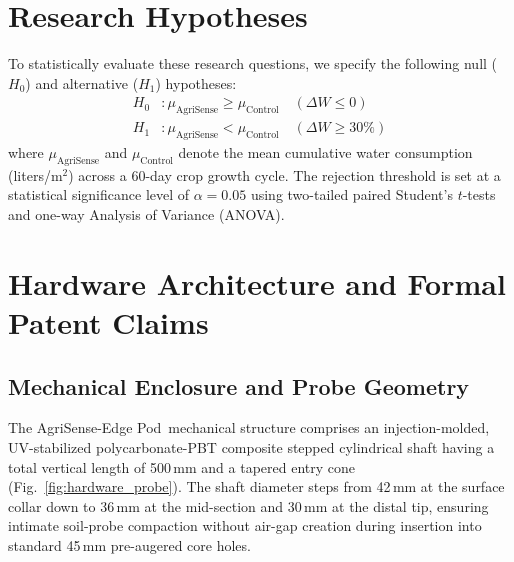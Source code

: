 \documentclass[journal,10pt,twocolumn]{IEEEtran}
\begin{document}
\section{Research Hypotheses}
To statistically evaluate these research questions, we specify the following null ($H_0$) and alternative ($H_1$) hypotheses:
\begin{equation}
\begin{aligned}
    H_0 &: \mu_{\text{AgriSense}} \ge \mu_{\text{Control}} \quad (\Delta W \le 0) \\
    H_1 &: \mu_{\text{AgriSense}} < \mu_{\text{Control}} \quad (\Delta W \ge 30\%)
\end{aligned}
\end{equation}
where $\mu_{\text{AgriSense}}$ and $\mu_{\text{Control}}$ denote the mean cumulative water consumption (liters/m$^2$) across a 60-day crop growth cycle. The rejection threshold is set at a statistical significance level of $\alpha = 0.05$ using two-tailed paired Student's $t$-tests and one-way Analysis of Variance (ANOVA).

\section{Hardware Architecture and Formal Patent Claims}
\subsection{Mechanical Enclosure and Probe Geometry}
The AgriSense-Edge Pod\texttrademark\ mechanical structure comprises an injection-molded, UV-stabilized polycarbonate-PBT composite stepped cylindrical shaft having a total vertical length of 500\,mm and a tapered entry cone (Fig.~\ref{fig:hardware_probe}). The shaft diameter steps from 42\,mm at the surface collar down to 36\,mm at the mid-section and 30\,mm at the distal tip, ensuring intimate soil-probe compaction without air-gap creation during insertion into standard 45\,mm pre-augered core holes.
\end{document}
